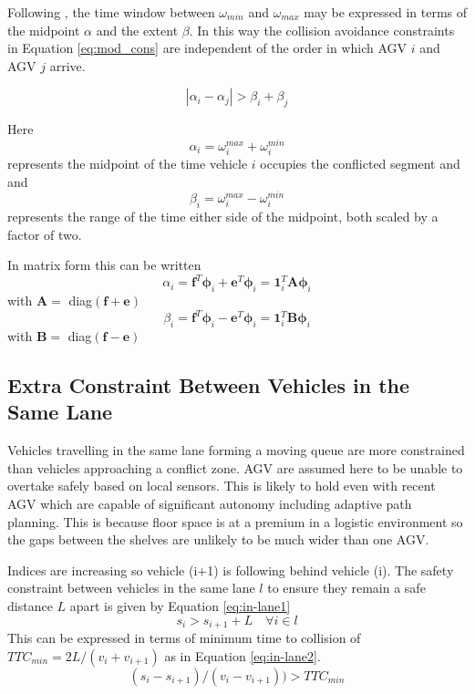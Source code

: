 Following \cite{Digani2019}, the time window between $\omega_{min}$ and $\omega_{max}$ may be expressed in terms of the midpoint $\alpha$ and the extent $\beta$. In this way the collision avoidance constraints in Equation \ref{eq:mod_cons} are independent of the order in which AGV $i$ and AGV $j$ arrive.

\begin{equation}
\label{eq:mod_cons}
|\alpha_i - \alpha_j|> \beta_i + \beta_j
\end{equation}

Here
\begin{equation}
\alpha_i = \omega_i^{max} + \omega_i^{min}
\end{equation}
represents the midpoint of the time vehicle $i$ occupies the conflicted segment and and
\begin{equation}
\beta_i = \omega_i^{max} - \omega_i^{min}
\end{equation}
represents the range of the time either side of the midpoint, both scaled by a factor of two.

In matrix form this can be written
\begin{equation}
\label{eq:alpha_mat}
\alpha_i = \bm{f}^T\bm{\phi}_i + \bm{e}^T\bm{\phi}_i = \bm{1}_i^T\bm{A}\bm{\phi}_i
\end{equation}
with $\bm{A}= $ diag$(\bm{f} + \bm{e})$
\begin{equation}
\label{eq:beta_mat}
\beta_i = \bm{f}^T\bm{\phi}_i - \bm{e}^T\bm{\phi}_i = \bm{1}_i^T\bm{B}\bm{\phi}_i
\end{equation}
with $\bm{B}= $ diag$(\bm{f} - \bm{e})$

\subsection{Extra Constraint Between Vehicles in the Same Lane}
Vehicles travelling in the same lane forming a moving queue are more constrained than vehicles approaching a conflict zone. AGV are assumed here to be unable to overtake safely based on local sensors. This is likely to hold even with recent AGV which are capable of significant autonomy including adaptive path planning. This is because floor space is at a premium in a logistic environment so the gaps between the shelves are unlikely to be much wider than one AGV.

Indices are increasing so vehicle (i+1) is following behind vehicle (i). The safety constraint between vehicles in the same lane $l$ to ensure they remain a safe distance $L$ apart is given by Equation \ref{eq:in-lane1}
\begin{equation}
s_{i} > s_{i+1} + L \quad \forall i \in l
\label{eq:in-lane1}
\end{equation}
This can be expressed in terms of minimum time to collision of $TTC_{min} = 2 L/(v_i + v_{i+1})$ as in Equation \ref{eq:in-lane2}.
\begin{equation}
(s_{i}-s_{i+1})/(v_i - v_{i+1})) > TTC_{min}
\label{eq:in-lane2}
\end{equation}

